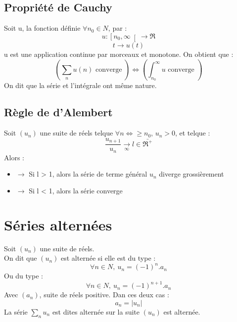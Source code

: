 \subsection{Propriété de Cauchy}
Soit u, la fonction définie $\forall n_0 \in N$, par : 
$$u : \left[n_0,\infty \right[ \rightarrow \Re$$
$$t \rightarrow u(t)$$
u est une application continue par morceaux et monotone. On obtient que :
$$(\sum_n u(n) \mbox{ converge }) \Leftrightarrow (\int_{n_0}^{\infty} u \mbox{ converge })$$
On dit que la série et l'intégrale ont même nature.
\subsection{Règle de d'Alembert}
\begin{prop}
Soit $(u_n)$ une suite de réels telque $\forall n \Leftrightarrow \geq n_0$, $u_n > 0$, et telque :
$$\dfrac{u_{n+1}}{u_n}\underset{\infty}\rightarrow l\in \bar{\Re^+}$$
Alors : 
\begin{itemize}
 \item{$\rightarrow$} Si l > 1, alors la série de terme général $u_n$ diverge grossièrement
 \item{$\rightarrow$} Si l < 1, alors la série converge
\end{itemize}
\end{prop}
\section{Séries alternées}
\begin{de}
Soit $(u_n)$ une suite de réels.\\
On dit que $(u_n)$ est alternée si elle est du type :
$$\forall n \in N,~ u_n = (-1)^n.a_n$$
Ou du type : 
$$\forall n \in N,~ u_n = (-1)^{n+1}.a_n$$
Avec $(a_n)$, suite de réels positive. Dan ces deux cas : 
$$a_n = |u_n|$$
La série $\underset{n}\sum u_n$ est dites alternée sur la suite $(u_n)$ est alternée.
\end{de}
